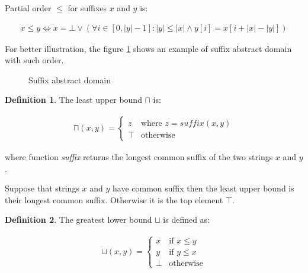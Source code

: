 \documentclass[12pt,final,oneside]{fithesis2}
\theoremstyle{definition}
\newtheorem{definition}{Definition}
\begin{document}
Partial order $\leq$ for suffixes $x$ and $y$ is:

\begin{align*}
x \leq y \Leftrightarrow
  x = \bot \lor (\forall i \in [0, |y| - 1] : |y| \leq |x| \land
    y[i] = x[i + |x| - |y|])
\end{align*}

For better illustration, the figure \ref{fig:suffixlattice} shows an
example of suffix abstract domain with such order.

\begin{figure}[h]
\centering
{}
\caption{Suffix abstract domain}
\label{fig:suffixlattice}
\end{figure}

\begin{definition}
\label{def:suffixjoin}
The least upper bound $\sqcap$ is:

\begin{align*}
\sqcap (x, y) =
\begin{cases}
z    & \text{where } z = \textit{suffix}(x,  y) \\
\top & \text{otherwise}
\end{cases}
\end{align*}

where function \textit{suffix} returns the longest common suffix of the
two strings $x$ and $y$.
\end{definition}

Suppose that strings $x$ and $y$ have common suffix then the least
upper bound is their longest common suffix. Otherwise it is the top
element $\top$.

\begin{definition}
\label{def:suffixmeet}
The greatest lower bound $\sqcup$ is defined as:

\begin{align*}
\sqcup (x, y) =
\begin{cases}
x    & \text{if } x \leq y \\
y    & \text{if } y \leq x \\
\bot & \text{otherwise}
\end{cases}
\end{align*}
\end{definition}
\end{document}
